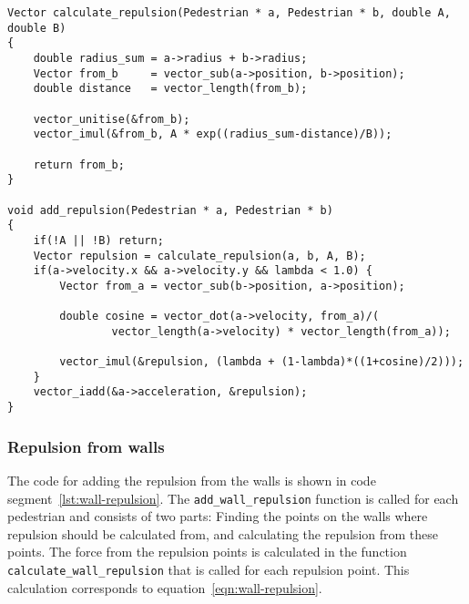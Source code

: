 \begin{lstlisting}[caption={Calculating the repulsion from other 
    pedestrians.},label=lst:pedestrian-repulsion]
Vector calculate_repulsion(Pedestrian * a, Pedestrian * b, double A, double B)
{
    double radius_sum = a->radius + b->radius;
    Vector from_b     = vector_sub(a->position, b->position);
    double distance   = vector_length(from_b);

    vector_unitise(&from_b);
    vector_imul(&from_b, A * exp((radius_sum-distance)/B));

    return from_b;
}

void add_repulsion(Pedestrian * a, Pedestrian * b)
{
    if(!A || !B) return;
    Vector repulsion = calculate_repulsion(a, b, A, B);
	if(a->velocity.x && a->velocity.y && lambda < 1.0) {
		Vector from_a = vector_sub(b->position, a->position);

		double cosine = vector_dot(a->velocity, from_a)/(
				vector_length(a->velocity) * vector_length(from_a));

		vector_imul(&repulsion, (lambda + (1-lambda)*((1+cosine)/2)));
	}
    vector_iadd(&a->acceleration, &repulsion);
}
\end{lstlisting}

\subsubsection{Repulsion from walls}
The code for adding the repulsion from the walls is shown in code 
segment~\ref{lst:wall-repulsion}. The \texttt{add\_wall\_repulsion} function 
is called for each pedestrian and consists of two parts: Finding the points on the 
walls where repulsion should be calculated from, and calculating the repulsion 
from these points. The force from the repulsion points is calculated in the 
function \texttt{calculate\_wall\_repulsion} that is called for each repulsion 
point. This calculation corresponds to equation~\eqref{eqn:wall-repulsion}.


